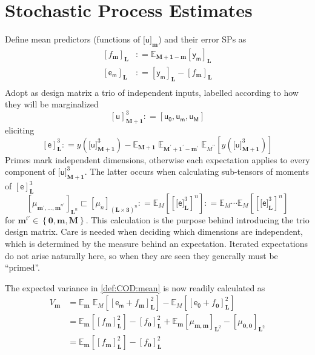 \documentclass[preprint,12pt]{elsarticle}
\newcommand*{\M}[1]{\ensuremath{#1}\xspace}
\newcommand*{\x}{\times}
\newcommand*{\mi}[1]{\mathbf{#1}}
\newcommand*{\rv}[1]{\mathsf{#1}}
\newcommand*{\te}[2][]{\left\lbrack{#2}\right\rbrack_{#1}}
\newcommand*{\tte}[2][]{\lbrack{#2}\rbrack_{#1}}
\newcommand*{\deq}{\M{\mathrel{\mathop:}=}}
\newcommand*{\ev}[3][]{\mathbb{E}_{#3}^{#1}\!\left\lbrack{#2}\right\rbrack}
\newcommand*{\evt}[3][]{\mathbb{E}_{#3}^{#1}\!#2}
\newcommand*{\set}[1]{\M{\left\lbrace{#1}\right\rbrace}}
\begin{document}
\section{Stochastic Process Estimates}\label{sec:SP}
    Define mean predictors (functions of $\tte[\mi{m}]{\rv{u}}$) and their error SPs as
    \begin{equation}
        \begin{aligned}
            \te[\mi{L}]{f_{\mi{m}}} &\deq \evt{\te[\mi{L}]{\rv{y_m}}}{\mi{M+1-m}} \\
            \te[\mi{L}]{\rv{e_m}} &\deq \te[\mi{L}]{\rv{y_m}} - \te[\mi{L}]{f_{\mi{m}}} \\
        \end{aligned}
    \end{equation}
    Adopt as design matrix a trio of independent inputs, labelled according to how they will be marginalized
    \begin{equation*}
            \te[\mi{M+1}]{\rv{u}}^3 \deq \left\lbrack \rv{u_0},\rv{u_m},\rv{u_M} \right\rbrack
    \end{equation*}
    eliciting
    \begin{equation*}
        \te[\mi{L}]{\rv{e}}^3 \deq y(\tte[\mi{M+1}]{\rv{u}}^3) - \evt{\;\evt{\;\ev{y(\tte[\mi{M+1}]{\rv{u}}^3)}{M^{\prime\prime}}}{\mi{M^{\prime}+1^{\prime}-m^{\prime}}}}{\mi{M+1}}
    \end{equation*}
    Primes mark independent dimensions, otherwise each expectation applies to every component of $\tte[\mi{M+1}]{\rv{u}}^3$. The latter occurs when calculating sub-tensors of moments of $\te[\mi{L}]{\rv{e}}^3$
    \begin{equation*}
        \te[\mi{L}^{n}]{\mu_{\mi{m^{\prime},\ldots,m}^{n\prime}}} \sqsubset \te[(\mi{L\x 3})^{n}]{\mu_{n}} \deq \ev{\te[]{\tte[\mi{L}]{\rv{e}}^{3}}^{n}}{M} \deq \evt{\cdots\ev{\te[]{\tte[\mi{L}]{\rv{e}}^{3}}^{n}}{M}}{M}
    \end{equation*}
    for $\mi{m}^{i\prime} \in \set{\mi{0},\mi{m},\mi{M}}$. This calculation is the purpose behind introducing the trio design matrix. Care is needed when deciding which dimensions are independent, which is determined by the measure behind an expectation. Iterated expectations do not arise naturally here, so when they are seen they generally must be ``primed''.

    The expected variance in \cref{def:COD:mean} is now readily calculated as
    \begin{equation}
        \begin{aligned}
            V_{\mi{m}} 
            &= \evt{\;\ev{\te[\mi{L}]{\rv{e_m} + f_{\mi{m}}}^{2}}{M}}{\mi{m}}
            - \ev{\te[\mi{L}]{\rv{e_0} + f_{\mi{0}}}^{2}}{M} \\
            &= \ev{\te[\mi{L}]{f_{\mi{m}}}^{2}}{\mi{m}} - \te[\mi{L}]{f_{\mi{0}}}^{2} + 
            \evt{\te[\mi{L}^2]{\mu_{\mi{m,m}}}}{\mi{m}} - \te[\mi{L}^2]{\mu_{\mi{0,0}}} \\
            &= \ev{\te[\mi{L}]{f_{\mi{m}}}^{2}}{\mi{m}} - \te[\mi{L}]{f_{\mi{0}}}^{2}
        \end{aligned}
    \end{equation}
\end{document}
